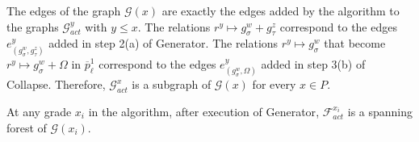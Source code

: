 \documentclass[english,a4paper,nolineno,cleveref]{socg-lipics-v2021}
\begin{document}
\begin{remark}
The edges of the graph $\mathcal{G}(x)$ are exactly the edges added by the algorithm to the graphs $\mathcal{G}_{act}^{y}$ with $y\leq x$. The relations $r^y\mapsto g^w_\sigma+g^z_\tau$ correspond to the edges $e^{y}_{(g^w_\sigma,g^z_\tau)}$ added in step 2(a) of {\sc Generator}. The relations $r^y\mapsto g^w_\sigma$ that become $r^y\mapsto g^w_\sigma+\Omega$ in $\overline{p}_\ell^1 $ correspond to the edges $e^y_{(g^w_\sigma,\Omega)}$ added in step 3(b) of {\sc Collapse}. Therefore, $\mathcal{G}_{act}^x$ is a subgraph of $\mathcal{G}(x)$ for every $x\in P$.
\end{remark}


\begin{lemma}\label{prop:spanning_forest}
At any grade $x_i$ in the algorithm, after execution of {\sc Generator}, $\mathcal{F}_{act}^{x_i}$ is a spanning forest of $\mathcal{G}(x_i)$.
\end{lemma}
\end{document}
